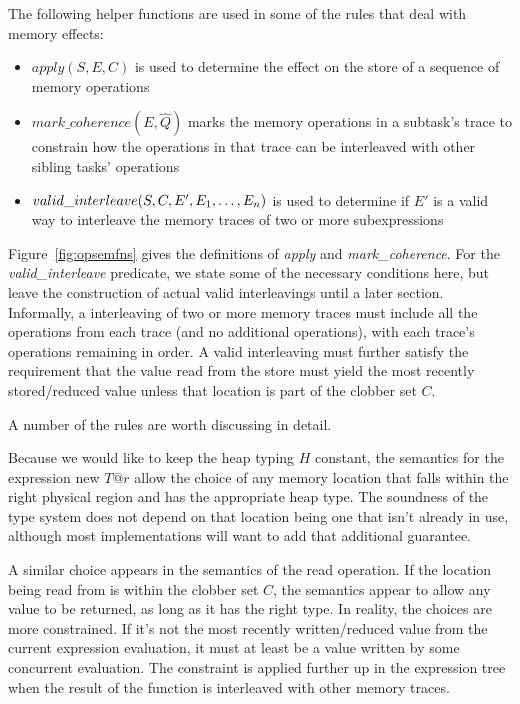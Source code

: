 \begin{itemize}
The following helper functions are used in some of the rules that deal with memory effects:
\begin{itemize}
\item $apply(S, E, C)$ is used to determine the effect on the store of a sequence of memory operations
\item $mark\_coherence(E, \hat Q)$ marks the memory operations in a subtask's trace to
constrain how the operations in that trace can be interleaved with other sibling tasks' operations
\item $valid\_interleave(S, C, E', {E}_1,\ldots,{E}_n)$ is used to determine if $E'$ is a valid way to
interleave the memory traces of two or more subexpressions
\end{itemize}
Figure~\ref{fig:opsemfns} gives the definitions of {\em apply} and {\em mark\_coherence}.  For
the {\em valid\_interleave} predicate, we state some of the necessary conditions here, but leave 
the construction of actual valid interleavings until a later section.  Informally, a interleaving
of two or more memory traces must include all the operations from each trace (and no additional
operations), with each trace's operations remaining in order.  A valid interleaving must further
satisfy the requirement that the value read from the store must yield the most recently 
stored/reduced value unless that location is part of the clobber set $C$.
\end{itemize}

A number of the rules are worth discussing in detail.

Because we would like to keep the heap typing $H$ constant, the semantics for the expression
new $T@r$ allow the choice of any memory location that falls within the right physical region
and has the appropriate heap type.  The soundness of the type system does not depend on that
location being one that isn't already in use, although most implementations will want to 
add that additional guarantee.

A similar choice appears in the semantics of the read operation.  If the location being read
from is within the clobber set $C$, the semantics appear to allow any value to be returned, as
long as it has the right type.  In reality, the choices are more constrained.  If it's not the
most recently written/reduced value from the current expression evaluation, it must at least be
a value written by some concurrent evaluation.  The constraint is applied further up in the 
expression tree when the result of the function is interleaved with other memory traces.


